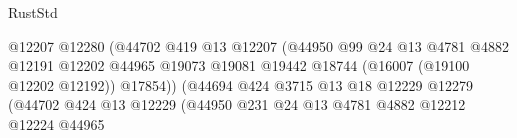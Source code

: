 \begin{lexlean}{RustStd}
\begin{coremodule}
                                                      @12207
                                                      @12280
                                                      (@44702
                                                        @419
                                                        @13
                                                        @12207
                                                        (@44950
                                                          @99
                                                          @24
                                                          @13
                                                          @4781
                                                          @4882
                                                          @12191
                                                          @12202
                                                          @44965
                                                          @19073
                                                          @19081
                                                          @19442
                                                          @18744
                                                          (@16007 (@19100 @12202 @12192))
                                                          @17854))
                                                      (@44694
                                                        @424
                                                        @3715
                                                        @13
                                                        @18
                                                        @12229
                                                        @12279
                                                        (@44702
                                                          @424
                                                          @13
                                                          @12229
                                                          (@44950
                                                            @231
                                                            @24
                                                            @13
                                                            @4781
                                                            @4882
                                                            @12212
                                                            @12224
                                                            @44965

\end{coremodule}
\end{lexlean}
